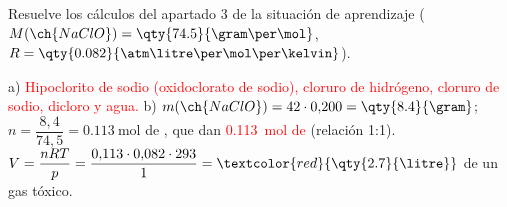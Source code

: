 \begin{exercise}
    Resuelve los cálculos del apartado 3 de la situación de aprendizaje (\(M(\ch{NaClO}) = \qty{74.5}{\gram\per\mol}\),
    \(R = \qty{0.082}{\atm\litre\per\mol\per\kelvin}\)).
    \begin{solu}
        a) \textcolor{red}{Hipoclorito de sodio (oxidoclorato de sodio), cloruro de hidrógeno, cloruro de sodio, dicloro y agua.}
        b) \(m(\ch{NaClO}) = 42 \cdot 0{,}200 = \qty{8.4}{\gram}\); \(n = \dfrac{8{,}4}{74{,}5} = \qty{0.113}{\mol}\) de ,
        que dan \textcolor{red}{\qty{0.113}{\mol} de } (relación 1:1).
        \(V = \dfrac{nRT}{p} = \dfrac{0{,}113 \cdot 0{,}082 \cdot 293}{1} = \textcolor{red}{\qty{2.7}{\litre}}\) de un gas tóxico.
    \end{solu}
\end{exercise}

\fussy
